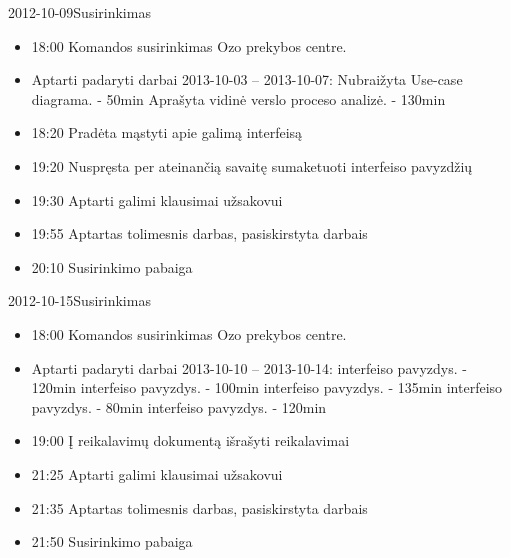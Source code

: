 \begin{loggentry}{2012-10-09}{Susirinkimas}

	\begin{itemize}
		\item 18:00 Komandos susirinkimas Ozo prekybos centre.
		\item Aptarti padaryti darbai 2013-10-03 – 2013-10-07:
			\subitem Nubraižyta Use-case diagrama. - 50min
			\subitem Aprašyta vidinė verslo proceso analizė. - 130min
		\item 18:20 Pradėta mąstyti apie galimą interfeisą
		\item 19:20 Nuspręsta per ateinančią savaitę sumaketuoti interfeiso pavyzdžių
		\item 19:30 Aptarti galimi klausimai užsakovui
		\item 19:55 Aptartas tolimesnis darbas, pasiskirstyta darbais
		\item 20:10 Susirinkimo pabaiga
	\end{itemize}
\end{loggentry}

\begin{loggentry}{2012-10-15}{Susirinkimas}

	\begin{itemize}
		\item 18:00 Komandos susirinkimas Ozo prekybos centre.
		\item Aptarti padaryti darbai 2013-10-10 – 2013-10-14:
			 interfeiso pavyzdys. - 120min
			 interfeiso pavyzdys. - 100min
			 interfeiso pavyzdys. - 135min
			 interfeiso pavyzdys. - 80min
			 interfeiso pavyzdys. - 120min
		\item 19:00 Į reikalavimų dokumentą išrašyti reikalavimai
		\item 21:25 Aptarti galimi klausimai užsakovui
		\item 21:35 Aptartas tolimesnis darbas, pasiskirstyta darbais
		\item 21:50 Susirinkimo pabaiga
	\end{itemize}
\end{loggentry}